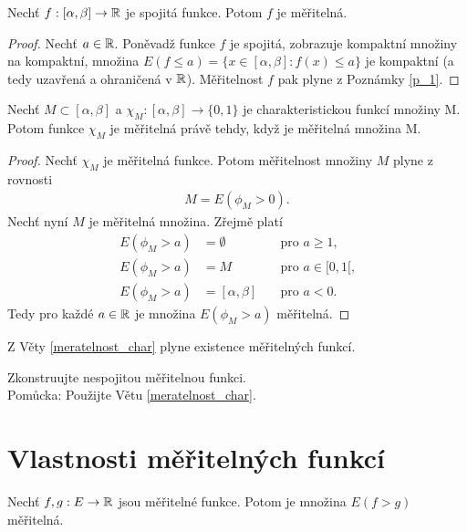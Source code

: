 \begin{theorem}
Nechť $f:[\alpha, \beta] \to \mathbb{R}$ je spojitá funkce. 
Potom $f$ je měřitelná.
\end{theorem}

\begin{proof}
Nechť $a \in \mathbb{R}$. Poněvadž funkce $f$ je spojitá, zobrazuje kompaktní množiny na kompaktní, množina $E(f \leq a)=\{x \in [\alpha, \beta]: f(x) \leq a\}$ je kompaktní (a tedy uzavřená a ohraničená v $\mathbb{R}$). Měřitelnost $f$ pak plyne z Poznámky \ref{p_1}.
\end{proof}

\begin{theorem}
Nechť $M \subset [\alpha,\beta]$ a $\chi_M:[\alpha,\beta] \to \{0,1\}$ je charakteristickou funkcí množiny M. 
Potom funkce $\chi_M$ je měřitelná právě tehdy, když je měřitelná množina M.
\label{meratelnost_char}
\end{theorem}

\begin{proof}
Nechť $\chi_M$ je měřitelná funkce. 
Potom měřitelnost množiny $M$ plyne z rovnosti 
\begin{align*}
M=E(\phi_M>0).
\end{align*}
Nechť nyní $M$ je měřitelná množina. Zřejmě platí
\begin{align*}
E(\phi_M>a) &= \emptyset \quad &\text{pro $a \geq 1$,} \\
E(\phi_M>a) &= M \quad &\text{pro $a \in [0,1[$,} \\
E(\phi_M>a) &= [\alpha,\beta] \quad &\text{pro $a <0$.} 
\end{align*}
Tedy pro každé $a \in \mathbb{R}$ je množina $E(\phi_M>a)$ měřitelná.
\end{proof}


\begin{poznamka}
Z Věty \ref{meratelnost_char} plyne existence měřitelných funkcí. 
\end{poznamka}

\begin{uloha}
Zkonstruujte nespojitou měřitelnou funkci.\\
Pomůcka: Použijte Větu \ref{meratelnost_char}.
\end{uloha}


\section{Vlastnosti měřitelných funkcí}

\begin{lemma}
Nechť $f,g:E \to \mathbb{R}$ jsou měřitelné funkce. Potom je množina $E(f>g)$ měřitelná.
\label{lemma_1.11}
\end{lemma}

